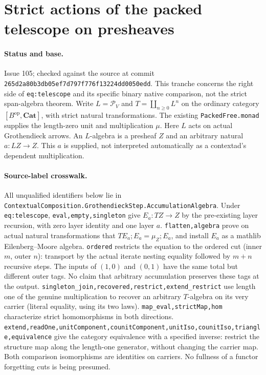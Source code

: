 \section*{Strict actions of the packed telescope on presheaves}
\paragraph{Status and base.}
Issue 105; checked against the source at commit
\texttt{265d2a80b3db05ef7d797f776f13224dd0050edd}.
This tranche concerns the right side of \texttt{eq:telescope} and its
specific binary native comparison, not the strict span-algebra theorem.
Write $L=\mathcal P_V$ and $T=\coprod_{n\ge0}L^n$ on the ordinary category
$[B^{\mathrm{op}},\mathbf{Cat}]$, with strict natural transformations.
The existing \texttt{PackedFree.monad} supplies the length-zero unit
and multiplication $\mu$. Here $L$ acts on actual Grothendieck arrows.
An $L$-algebra is a presheaf $Z$ and an arbitrary natural
$a:LZ\to Z$. This $a$ is supplied, not interpreted automatically as
a contextad's dependent multiplication.
\paragraph{Source-label crosswalk.}
All unqualified identifiers below lie in
\texttt{ContextualComposition.GrothendieckStep.AccumulationAlgebra}.
Under \texttt{eq:telescope}, \texttt{eval,empty,singleton} give
$E_a:TZ\to Z$ by the pre-existing layer recursion, with zero layer
identity and one layer $a$. \texttt{flatten,algebra} prove on actual
natural transformations that $T E_a;E_a=\mu_Z;E_a$, and install $E_a$
as a mathlib Eilenberg--Moore algebra. \texttt{ordered} restricts the
equation to the ordered cut (inner $m$, outer $n$): transport by the
actual iterate nesting equality followed by $m+n$ recursive steps.
The inputs of $(1,0)$ and $(0,1)$ have the same total but different
outer tags. No claim that arbitrary accumulation preserves these
tags at the output. \texttt{singleton\_join,recovered,restrict,extend\_restrict}
use length one of the genuine multiplication to recover an arbitrary
$T$-algebra on its very carrier (literal equality, using its two laws).
\texttt{map\_eval,strictMap,hom} characterize strict homomorphisms in
both directions. \texttt{extend,readOne,unitComponent,counitComponent,unitIso,counitIso,triangle,equivalence}
give the category equivalence with a specified inverse: restrict the
structure map along the length-one generator, without changing the
carrier map. Both comparison isomorphisms are identities on carriers.
No fullness of a functor forgetting cuts is being presumed.

